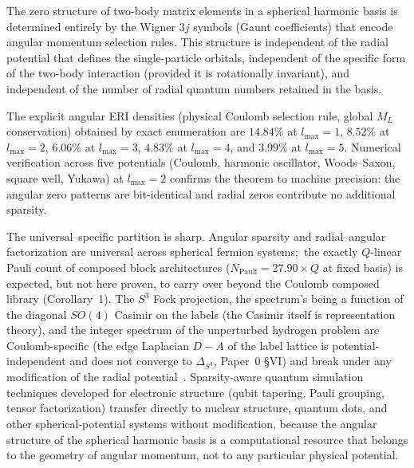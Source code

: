\documentclass[twocolumn,pra,amsmath,amssymb,superscriptaddress]{revtex4-2}
\begin{document}
The zero structure of two-body matrix elements in a spherical
harmonic basis is determined entirely by the Wigner 3$j$ symbols
(Gaunt coefficients) that encode angular momentum selection rules.
This structure is independent of the radial potential that defines
the single-particle orbitals, independent of the specific form of
the two-body interaction (provided it is rotationally invariant),
and independent of the number of radial quantum numbers retained in
the basis.

The explicit angular ERI densities (physical Coulomb selection rule,
global $M_L$ conservation) obtained by exact enumeration are
$14.84\%$ at $l_{\max}=1$, $8.52\%$ at $l_{\max}=2$, $6.06\%$ at
$l_{\max}=3$, $4.83\%$ at $l_{\max}=4$, and $3.99\%$ at $l_{\max}=5$.
Numerical verification across five potentials (Coulomb, harmonic
oscillator, Woods--Saxon, square well, Yukawa) at $l_{\max}=2$
confirms the theorem to machine precision: the angular zero patterns
are bit-identical and radial zeros contribute no additional
sparsity.

The universal--specific partition is sharp.  Angular sparsity and
radial--angular factorization are universal across spherical fermion
systems;\ the exactly $Q$-linear Pauli count of composed block
architectures ($N_{\mathrm{Pauli}} = 27.90 \times Q$ at fixed basis)
is expected, but not here proven, to carry over beyond
the Coulomb composed library (Corollary~1).  The
$S^3$ Fock projection, the spectrum's being a function of the diagonal
$SO(4)$ Casimir on the labels (the Casimir itself is representation
theory), and the integer spectrum of the unperturbed hydrogen problem
are Coulomb-specific (the edge Laplacian $D-A$ of the label lattice is
potential-independent and does not converge to $\Delta_{S^3}$,
Paper~0 \S VI) and break under any modification of the radial
potential~\cite{GeoVac_Paper23}.  Sparsity-aware quantum simulation
techniques developed for electronic structure (qubit tapering, Pauli
grouping, tensor factorization) transfer directly to nuclear
structure, quantum dots, and other spherical-potential systems
without modification, because the angular structure of the
spherical harmonic basis is a computational resource that belongs
to the geometry of angular momentum, not to any particular physical
potential.

\end{document}
